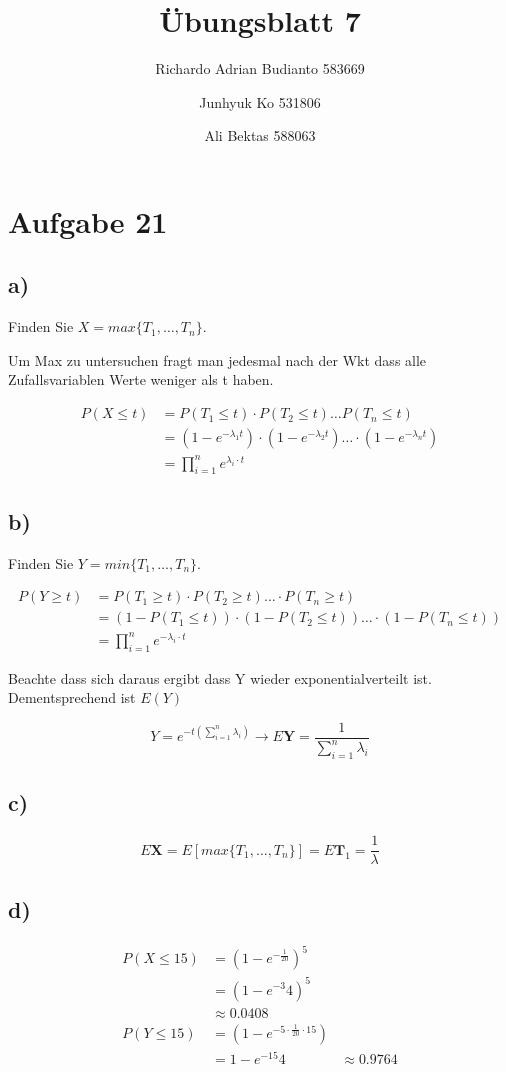 \documentclass{article}
\title{Übungsblatt 7}
\author{Richardo Adrian Budianto  583669 \and Junhyuk Ko  531806 \and Ali Bektas 588063 }
\begin{document}
	
	\maketitle

	\section*{Aufgabe 21}

	\subsection*{a)}
		Finden Sie $ X = max\{ T_1 , \dots , T_n \}$. 

		Um Max zu untersuchen fragt man jedesmal nach der Wkt dass alle Zufallsvariablen Werte weniger als t haben.

		\begin{align*}
			P(X \leq t) &= P( T_1 \leq t) \cdot P(T_2 \leq t) \dots P(T_n \leq t)\\
			&= (1-e^{-\lambda_1t})\cdot (1-e^{-\lambda_2t}) \dots \cdot (1-e^{-\lambda_nt})\\
			&= \prod_{i=1}^{n} e^{\lambda_i \cdot t}
		\end{align*}
	\subsection*{b)}
		Finden Sie $ Y = min\{ T_1 , \dots , T_n \}$. 

		\begin{align*}
			P(Y \geq t) &= P(T_1 \geq t) \cdot P(T_2 \geq t) \dots \cdot P(T_n \geq t) \\
			&= (1- P(T_1 \leq t)) \cdot (1-P(T_2 \leq t)) \dots \cdot (1-P(T_n \leq t)) \\
			&= \prod_{i=1}^{n} e^{-\lambda_i \cdot t}
		\end{align*}

		Beachte dass sich daraus ergibt dass Y wieder exponentialverteilt ist. Dementsprechend ist $E(Y)$

		\[
			Y = e^{-t(\sum_{i=1}^{n} \lambda_i)}  \rightarrow  E\textbf{Y} = \frac{1}{\sum_{i=1}^{n} \lambda_i}
		\]

	\subsection*{c)}
		\[
			E\textbf{X} = E[max\{T_1, \dots , T_n\}] = E\textbf{T}_1 = \frac{1}{\lambda} 
		\]

	\subsection*{d)}
		\begin{align*}
			P(X \leq 15) &= (1 - e^{-\frac{1}{20}})^5 \\
				&= (1-e^{-3}{4})^5 \\
				&\approx  0.0408\\
			P(Y \leq 15) &= (1- e^{-5 \cdot \frac{1}{20} \cdot 15})\\
			 	&= 1 - e^{-15}{4} 
			 	&\approx 0.9764 
		\end{align*}
			
\end{document}
